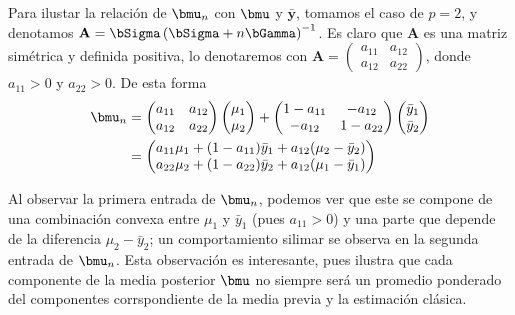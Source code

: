 Para ilustar la relaci\'on de $\bmu_n$ con $\bmu$ y $\bar{\mathbf{y}}$, tomamos el caso de $p=2$, y denotamos $\mathbf{A}=\bSigma\left(\bSigma+n\bGamma\right)^{-1}$. Es claro que $\mathbf{A}$ es una matriz sim\'etrica y definida positiva, lo denotaremos con $\mathbf{A}=\begin{pmatrix}a_{11}&a_{12}\\ a_{12}&a_{22}\end{pmatrix}$, donde $a_{11}>0$ y $a_{22}>0$. De esta forma
\begin{align*}
\bmu_n&=\begin{pmatrix}a_{11}&a_{12}\\ a_{12}&a_{22}\end{pmatrix}\begin{pmatrix}\mu_{1}\\ \mu_{2}\end{pmatrix}+\begin{pmatrix}1-a_{11}&-a_{12}\\ -a_{12}&1-a_{22}\end{pmatrix}\begin{pmatrix}\bar{y}_{1}\\ \bar{y}_{2}\end{pmatrix}\\
&=\begin{pmatrix}a_{11}\mu_1+(1-a_{11})\bar{y}_{1}+a_{12}(\mu_2-\bar{y}_{2})\\a_{22}\mu_2+(1-a_{22})\bar{y}_{2}+a_{12}(\mu_1-\bar{y}_{1})\end{pmatrix}
\end{align*}

Al observar la primera entrada de $\bmu_n$, podemos ver que este se compone de una combinaci\'on convexa entre $\mu_1$ y $\bar{y}_1$ (pues $a_{11}>0$) y una parte que depende de la diferencia $\mu_2-\bar{y}_{2}$; un comportamiento silimar se observa en la segunda entrada de $\bmu_n$. Esta observaci\'on es interesante, pues ilustra que cada componente de la media posterior $\bmu$ no siempre ser\'a un promedio ponderado del componentes corrspondiente de la media previa y la estimaci\'on cl\'asica.

